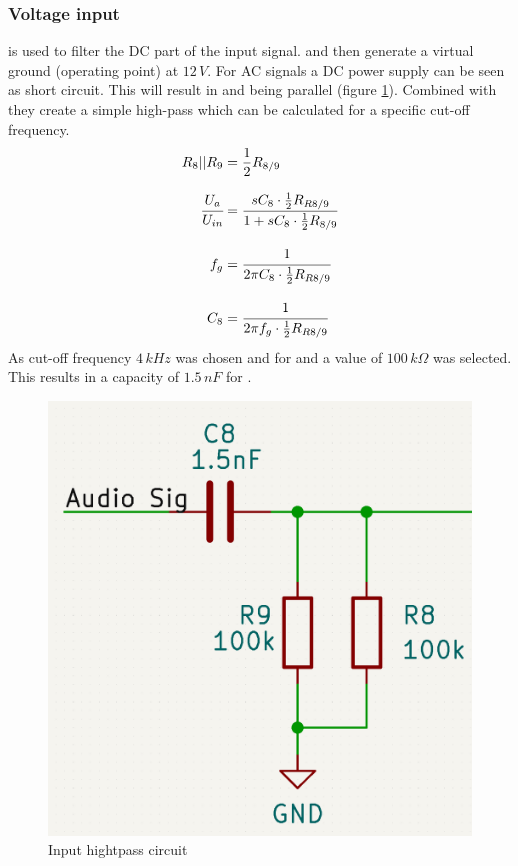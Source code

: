 \subsubsection*{Voltage input}
%
 is used to filter the DC part of the input signal.  and  then generate a virtual ground (operating point) at $12\,V$. For AC signals a DC power supply can be seen as short circuit. This will result in  and  being parallel (figure \ref{fig:pcb:amp_hp}). Combined with  they create a simple high-pass which can be calculated for a specific cut-off frequency.
%
\begin{align}
  R_8 || R_9 &= \frac{1}{2} R_{8/9} \pmath
  \cfrac{U_a}{U_{in}} &= \cfrac{sC_8\cdot \frac{1}{2}R_{R8/9}}{1 + sC_8\cdot \frac{1}{2}R_{8/9}} \pmath
  f_g &= \cfrac{1}{2 \pi C_8 \cdot \frac{1}{2}R_{R8/9}} \pmath
  C_8 &= \cfrac{1}{2 \pi f_g \cdot \frac{1}{2}R_{R8/9}}
\end{align}
%
As cut-off frequency $4\,kHz$ was chosen and for  and  a value of $100\,k\Omega$ was selected. This results in a capacity of $1.5\,nF$ for .
%
\begin{figure}
  \centering
  \includegraphics[height=\smallheight]{src/assets/pictures/circuit/amp_hp_circuit.png}
  \caption{Input hightpass circuit}\label{fig:pcb:amp_hp}
\end{figure}
%
